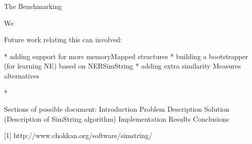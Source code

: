 The Benchmarking 

We 

Future work relating this can involved:

* adding support for more memoryMapped structures
* building a bootstrapper (for learning NE) based on NERSimString
* adding extra similarity Measures alternatives

*

Sections of possible document:
	Introduction
	Problem Description
	Solution (Description of SimString algorithm)
	Implementation
	Results
	Conclusions

 






[1] http://www.chokkan.org/software/simstring/
